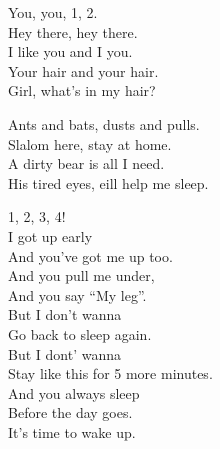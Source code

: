 
\label{ep:teenage-gizzard}




You, you, 1, 2. \\

Hey there, hey there. \\
I like you and I  you. \\
Your hair and your hair. \\

Girl, what's in my hair? \\




Ants and bats, dusts and pulls. \\
Slalom here, stay at home. \\

A dirty bear is all I need. \\
His tired eyes, eill help me sleep. \\




1, 2, 3, 4! \\

I got up early \\
And you've got me up too. \\
And you pull me under, \\
And you say ``My leg''. \\
But I don't wanna \\
Go back to sleep again. \\
But I dont' wanna \\
Stay like this for 5 more minutes. \\

And you always sleep \\
Before the day goes. \\
It's time to wake up. \\

